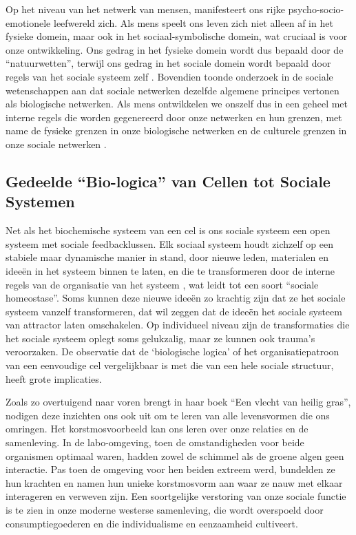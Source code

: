 \documentclass[
  11pt,
]{book}
\begin{document}
Op het niveau van het netwerk van mensen, manifesteert ons rijke psycho-socio-emotionele leefwereld zich. Als mens speelt ons leven zich niet alleen af in het fysieke domein, maar ook in het sociaal-symbolische domein, wat cruciaal is voor onze ontwikkeling. Ons gedrag in het fysieke domein wordt dus bepaald door de ``natuurwetten'', terwijl ons gedrag in het sociale domein wordt bepaald door regels van het sociale systeem zelf \citep{capraLuisi2014}. Bovendien toonde onderzoek in de sociale wetenschappen aan dat sociale netwerken dezelfde algemene principes vertonen als biologische netwerken. Als mens ontwikkelen we onszelf dus in een geheel met interne regels die worden gegenereerd door onze netwerken en hun grenzen, met name de fysieke grenzen in onze biologische netwerken en de culturele grenzen in onze sociale netwerken \citep{capraLuisi2014}.

\hypertarget{gedeelde-bio-logica-van-cellen-tot-sociale-systemen}{%
\subsection{Gedeelde ``Bio-logica'' van Cellen tot Sociale Systemen}\label{gedeelde-bio-logica-van-cellen-tot-sociale-systemen}}

Net als het biochemische systeem van een cel is ons sociale systeem een open systeem met sociale feedbacklussen. Elk sociaal systeem houdt zichzelf op een stabiele maar dynamische manier in stand, door nieuwe leden, materialen en ideeën in het systeem binnen te laten, en die te transformeren door de interne regels van de organisatie van het systeem \citep{capraLuisi2014}, wat leidt tot een soort ``sociale homeostase''. Soms kunnen deze nieuwe ideeën zo krachtig zijn dat ze het sociale systeem vanzelf transformeren, dat wil zeggen dat de ideeën het sociale systeem van attractor laten omschakelen. Op individueel niveau zijn de transformaties die het sociale systeem oplegt soms gelukzalig, maar ze kunnen ook trauma's veroorzaken. De observatie dat de `biologische logica' of het organisatiepatroon van een eenvoudige cel vergelijkbaar is met die van een hele sociale structuur, heeft grote implicaties.

Zoals \citet{Kimmerer2013} zo overtuigend naar voren brengt in haar boek ``Een vlecht van heilig gras'', nodigen deze inzichten ons ook uit om te leren van alle levensvormen die ons omringen. Het korstmosvoorbeeld kan ons leren over onze relaties en de samenleving. In de labo-omgeving, toen de omstandigheden voor beide organismen optimaal waren, hadden zowel de schimmel als de groene algen geen interactie. Pas toen de omgeving voor hen beiden extreem werd, bundelden ze hun krachten en namen hun unieke korstmosvorm aan waar ze nauw met elkaar interageren en verweven zijn. Een soortgelijke verstoring van onze sociale functie is te zien in onze moderne westerse samenleving, die wordt overspoeld door consumptiegoederen en die individualisme en eenzaamheid cultiveert.
\end{document}
